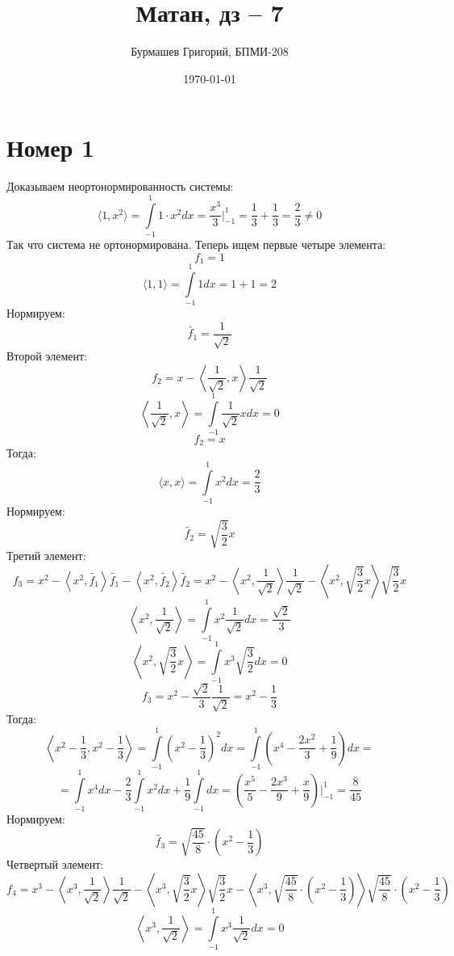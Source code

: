 \documentclass[a4paper,12pt]{article}
\author{Бурмашев Григорий, БПМИ-208}
\title{Матан, дз -- 7}
\date{\today}
\begin{document}
\maketitle
\section*{Номер 1}
Доказываем неортонормированность системы:
\[
\langle 1, x^2\rangle = \int\limits_{-1}^{1} 1 \cdot x^2 dx = \frac{x^3}{3} \Bigg|_{-1}^1 = \frac{1}{3} + \frac{1}{3} = \frac{2}{3} \neq 0 
\] 
Так что система не ортонормирована. Теперь ищем первые четыре элемента:
\[
f_1 = 1 
\]
\[
\langle 1, 1\rangle = \int\limits_{-1}^{1} 1 dx  = 1 + 1 = 2
\]
Нормируем:
\[
\widetilde{f_1} = \frac{1}{\sqrt{2}}
\]
Второй элемент:
\[
f_2 = x - \left\langle \frac{1}{\sqrt{2}}, x \right\rangle  \frac{1}{\sqrt{2}} 
\] 
\[
\left\langle \frac{1}{\sqrt{2}}, x \right\rangle  = \int\limits_{-1}^1 \frac{1}{\sqrt{2}} x dx = 0
\]
\[
f_2 = x
\]
Тогда:
\[
\langle x, x \rangle = \int\limits_{-1}^1 x^2 dx = \frac{2}{3}
\]
Нормируем:
\[
\widetilde{f_2} = \sqrt{\frac{3}{2}} x
\]
Третий элемент:
\[
f_3  = x^2 - \left\langle x^2, \widetilde{f_1} \right\rangle  \widetilde{f_1} - \left\langle x^2, \widetilde{f_2} \right\rangle  \widetilde{f_2}  = 
 x^2 - \left\langle x^2, \frac{1}{\sqrt{2}} \right\rangle  \frac{1}{\sqrt{2}} - \left\langle x^2, \sqrt{\frac{3}{2}} x \right\rangle  \sqrt{\frac{3}{2}} x
\]
\[
\left\langle x^2, \frac{1}{\sqrt{2}} \right\rangle  = \int\limits_{-1}^1 x^2 \frac{1}{\sqrt{2}} dx = \frac{\sqrt{2}}{3} 
\]
\[
\left\langle x^2, \sqrt{\frac{3}{2}} x \right\rangle  =  \int\limits_{-1}^1 x^3 
\sqrt{\frac{3}{2}} dx  = 0
\]
\[
f_3 = x^2 - \frac{\sqrt{2}}{3} \frac{1}{\sqrt{2}} = x^2 - \frac{1}{3}
\]
Тогда:
\[
\left\langle x^2 - \frac{1}{3}, x^2 - \frac{1}{3} \right\rangle
=
\int\limits_{-1}^1 \left(x^2 - \frac{1}{3}  \right)^2 dx =  \int\limits_{-1}^1 \left( x^4 - \frac{2x^2}{3} + \frac{1}{9}  \right)dx = 
\]
\[
=
\int\limits_{-1}^1 x^4 dx - \frac{2}{3} \int\limits_{-1}^1 x^2 dx + 
\frac{1}{9}\int\limits_{-1}^1 dx = \left(
\frac{x^5}{5} - \frac{2x^3}{9} + \frac{x}{9}
\right) \Bigg|_{-1}^1 = \frac{8}{45}
\]
Нормируем:
\[
\widetilde{f_3} = \sqrt{\frac{45}{8}} \cdot \left(x^2 - \frac{1}{3}\right)
\] 
Четвертый элемент:
\[
f_4 = x^3 - \left\langle x^3, \frac{1}{\sqrt{2}} \right\rangle \frac{1}{\sqrt{2}} - \left\langle x^3, \sqrt{\frac{3}{2}}x \right\rangle
\sqrt{\frac{3}{2}}x  - \left\langle x^3, \sqrt{\frac{45}{8}} \cdot \left(x^2 - \frac{1}{3}\right) \right\rangle\sqrt{\frac{45}{8}} \cdot \left(x^2 - \frac{1}{3}\right)
\]
\[
\left\langle x^3, \frac{1}{\sqrt{2}} \right\rangle = \int\limits_{-1}^1 x^3 \frac{1}{\sqrt{2}} dx = 0
\]
\end{document}
